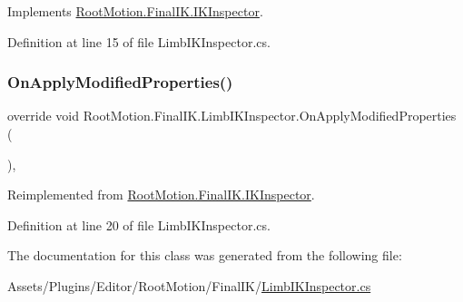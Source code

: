 Implements \mbox{\hyperlink{class_root_motion_1_1_final_i_k_1_1_i_k_inspector_a4c4528d5f5ce9af9e30c049138a5a5ca}{Root\+Motion.\+Final\+I\+K.\+I\+K\+Inspector}}.



Definition at line 15 of file Limb\+I\+K\+Inspector.\+cs.

\mbox{\label{class_root_motion_1_1_final_i_k_1_1_limb_i_k_inspector_a0811b1bc9ecabe082219a89830c086b2}} 
\subsubsection{\texorpdfstring{On\+Apply\+Modified\+Properties()}{OnApplyModifiedProperties()}}
{\footnotesize\ttfamily override void Root\+Motion.\+Final\+I\+K.\+Limb\+I\+K\+Inspector.\+On\+Apply\+Modified\+Properties (\begin{DoxyParamCaption}{ }\end{DoxyParamCaption})\hspace{0.3cm}{\ttfamily [protected]}, {\ttfamily [virtual]}}



Reimplemented from \mbox{\hyperlink{class_root_motion_1_1_final_i_k_1_1_i_k_inspector_a2909376aa17c40b7d7577761165d1c67}{Root\+Motion.\+Final\+I\+K.\+I\+K\+Inspector}}.



Definition at line 20 of file Limb\+I\+K\+Inspector.\+cs.



The documentation for this class was generated from the following file\+:\begin{DoxyCompactItemize}
\item 
Assets/\+Plugins/\+Editor/\+Root\+Motion/\+Final\+I\+K/\mbox{\hyperlink{_limb_i_k_inspector_8cs}{Limb\+I\+K\+Inspector.\+cs}}\end{DoxyCompactItemize}
